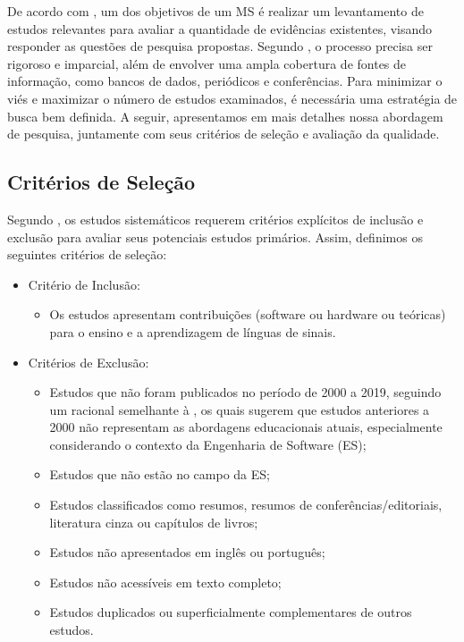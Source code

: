 De acordo com  , um dos objetivos de um MS é realizar um levantamento de estudos relevantes para avaliar a quantidade de evidências existentes, visando responder as questões de pesquisa propostas. Segundo , o processo precisa ser rigoroso e imparcial, além de envolver uma ampla cobertura de fontes de informação, como bancos de dados, periódicos e conferências. Para minimizar o viés e maximizar o número de estudos examinados, é necessária uma estratégia de busca bem definida. A seguir, apresentamos em mais detalhes nossa abordagem de pesquisa, juntamente com seus critérios de seleção e avaliação da qualidade.

\subsection{Critérios de Seleção}
\label{ms:conducao-busca}

Segundo , os estudos sistemáticos requerem critérios explícitos de inclusão e exclusão para avaliar seus potenciais estudos primários. Assim, definimos os seguintes critérios de seleção:

\begin{itemize}
    \item Critério de Inclusão:
    \begin{itemize}
        \item Os estudos apresentam contribuições (software ou hardware ou teóricas) para o ensino e a aprendizagem de línguas de sinais.
    \end{itemize}
    \item Critérios de Exclusão:
    \begin{itemize}
        \item Estudos que não foram publicados no período de 2000 a 2019, seguindo um racional semelhante à , os quais sugerem que estudos anteriores a 2000 não representam as abordagens educacionais atuais, especialmente considerando o contexto da Engenharia de Software (ES);
        \item Estudos que não estão no campo da ES;
        \item Estudos classificados como resumos, resumos de conferências/editoriais, literatura cinza ou capítulos de livros;
        \item Estudos não apresentados em inglês ou português;
        \item Estudos não acessíveis em texto completo;
        \item Estudos duplicados ou superficialmente complementares de outros estudos.
    \end{itemize}
\end{itemize}

